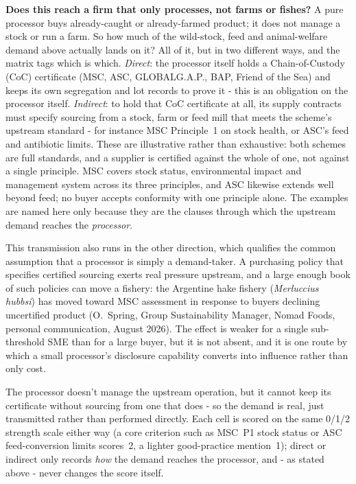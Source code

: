 \textbf{Does this reach a firm that only processes, not farms or fishes?} A
pure processor buys already-caught or already-farmed product; it does not
manage a stock or run a farm. So how much of the wild-stock, feed and
animal-welfare demand above actually lands on it? All of it, but in two
different ways, and the matrix tags which is which. \emph{Direct}: the
processor itself holds a Chain-of-Custody (CoC) certificate (MSC, ASC,
GLOBALG.A.P., BAP, Friend of the Sea) and keeps its own segregation and lot
records to prove it - this is an obligation on the processor itself.
\emph{Indirect}: to hold that CoC certificate at all, its supply contracts
must specify sourcing from a stock, farm or feed mill that meets the
scheme's upstream standard - for instance MSC Principle~1 on stock health, or
ASC's feed and antibiotic limits. These are illustrative rather than exhaustive:
both schemes are full standards, and a supplier is certified against the whole
of one, not against a single principle. MSC covers stock status, environmental
impact and management system across its three principles, and ASC likewise
extends well beyond feed; no buyer accepts conformity with one principle alone.
The examples are named here only because they are the clauses through which the
upstream demand reaches the \emph{processor}.

This transmission also runs in the other direction, which qualifies the common
assumption that a processor is simply a demand-taker. A purchasing policy that
specifies certified sourcing exerts real pressure upstream, and a large enough
book of such policies can move a fishery: the Argentine hake fishery
(\emph{Merluccius hubbsi}) has moved toward MSC assessment in response to buyers
declining uncertified product (O.~Spring, Group Sustainability Manager, Nomad
Foods, personal communication, August 2026). The effect is weaker for a single sub-threshold SME than for a
large buyer, but it is not absent, and it is one route by which a small
processor's disclosure capability converts into influence rather than only cost.

The processor doesn't manage the upstream operation, but
it cannot keep its certificate without sourcing from one that does - so
the demand is real, just transmitted rather than performed directly. Each
cell is scored on the same 0/1/2 strength scale either way (a core
criterion such as MSC~P1 stock status or ASC feed-conversion limits scores~2,
a lighter good-practice mention~1); direct or indirect only records \emph{how}
the demand reaches the processor, and - as stated above - never changes the score itself.

